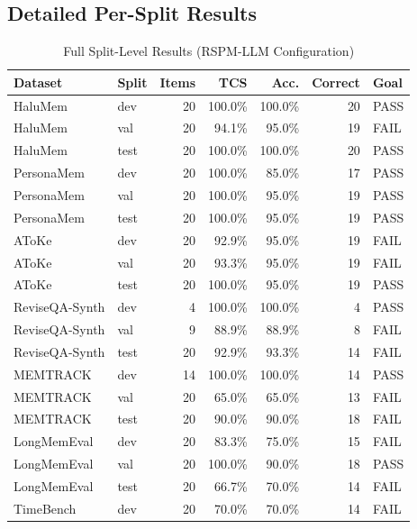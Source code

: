 \documentclass[11pt,a4paper]{article}
\begin{document}
\subsection{Detailed Per-Split Results}

\begin{table}[H]
\centering
\caption{Full Split-Level Results (RSPM-LLM Configuration)}
\footnotesize
\begin{tabular}{@{}llrrrrl@{}}
\toprule
\textbf{Dataset} & \textbf{Split} & \textbf{Items} & \textbf{TCS} & \textbf{Acc.} & \textbf{Correct} & \textbf{Goal} \\
\midrule
HaluMem        & dev   & 20 & 100.0\% & 100.0\% & 20 & PASS \\
HaluMem        & val   & 20 & 94.1\%  & 95.0\%  & 19 & FAIL \\
HaluMem        & test  & 20 & 100.0\% & 100.0\% & 20 & PASS \\
\midrule
PersonaMem     & dev   & 20 & 100.0\% & 85.0\%  & 17 & PASS \\
PersonaMem     & val   & 20 & 100.0\% & 95.0\%  & 19 & PASS \\
PersonaMem     & test  & 20 & 100.0\% & 95.0\%  & 19 & PASS \\
\midrule
AToKe          & dev   & 20 & 92.9\%  & 95.0\%  & 19 & FAIL \\
AToKe          & val   & 20 & 93.3\%  & 95.0\%  & 19 & FAIL \\
AToKe          & test  & 20 & 100.0\% & 95.0\%  & 19 & PASS \\
\midrule
ReviseQA-Synth & dev   & 4  & 100.0\% & 100.0\% & 4  & PASS \\
ReviseQA-Synth & val   & 9  & 88.9\%  & 88.9\%  & 8  & FAIL \\
ReviseQA-Synth & test  & 20 & 92.9\%  & 93.3\%  & 14 & FAIL \\
\midrule
MEMTRACK       & dev   & 14 & 100.0\% & 100.0\% & 14 & PASS \\
MEMTRACK       & val   & 20 & 65.0\%  & 65.0\%  & 13 & FAIL \\
MEMTRACK       & test  & 20 & 90.0\%  & 90.0\%  & 18 & FAIL \\
\midrule
LongMemEval    & dev   & 20 & 83.3\%  & 75.0\%  & 15 & FAIL \\
LongMemEval    & val   & 20 & 100.0\% & 90.0\%  & 18 & PASS \\
LongMemEval    & test  & 20 & 66.7\%  & 70.0\%  & 14 & FAIL \\
\midrule
TimeBench      & dev   & 20 & 70.0\%  & 70.0\%  & 14 & FAIL \\

\end{tabular}
\end{table}
\end{document}
